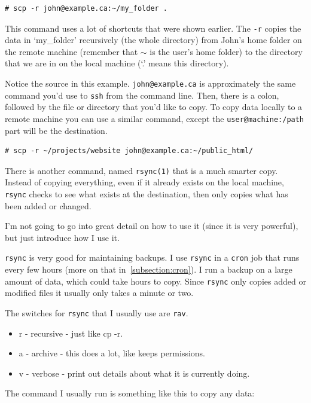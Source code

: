 {\tt \begin{verbatim}
# scp -r john@example.ca:~/my_folder .
\end{verbatim}
}

This command uses a lot of shortcuts that were shown earlier.  The {\tt -r} copies
the data in `my\_folder' recursively (the whole directory) from John's home folder on 
the remote machine (remember
that $\sim$ is the user's home folder) to the directory that we are in on the local machine (`.'
means this directory).

Notice the source in this example.  {\tt john@example.ca} is approximately the same
command you'd use to {\tt ssh} from the command line. Then, there is a colon, followed by
the file or directory that you'd like to copy. To copy data locally to a
remote machine you can use a similar command, except the {\tt user@machine:/path} 
part will be the destination.

{\tt \begin{verbatim}
# scp -r ~/projects/website john@example.ca:~/public_html/
\end{verbatim}
}


There is another command, named {\tt rsync(1)} that is a much smarter copy.
Instead of copying everything, even if it already exists on the local machine, 
{\tt rsync} checks to see what exists at the destination, then only copies 
what has been added or changed.

I'm not going to go into great detail on how to use it (since it is very powerful), but 
just introduce how I use it.

{\tt rsync} is very good for maintaining backups.  I use {\tt rsync} in a 
{\tt cron} job that runs every few hours (more on that in~\ref{subsection:cron}).
I run a backup on a large amount of data, which could take hours to copy. 
Since {\tt rsync} only copies added or modified files it usually only 
takes a minute or two.

The switches for {\tt rsync} that I usually use are {\tt rav}. 
\begin{itemize}
\item r - recursive - just like cp -r.
\item a - archive - this does a lot, like keeps permissions.
\item v - verbose - print out details about what it is currently doing.
\end{itemize}

The command I usually run is something like this to copy any data:

